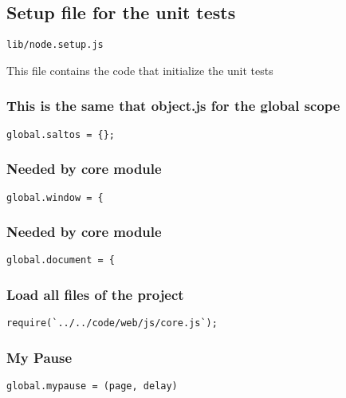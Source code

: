 \documentclass[a4paper]{article}
\begin{document}
\hypertarget{toc11}{}
\subsection{Setup file for the unit tests}

\begin{lstlisting}
lib/node.setup.js
\end{lstlisting}

This file contains the code that initialize the unit tests

\hypertarget{toc12}{}
\subsubsection{This is the same that object.js for the global scope}

\begin{lstlisting}
global.saltos = {};
\end{lstlisting}

\hypertarget{toc13}{}
\subsubsection{Needed by core module}

\begin{lstlisting}
global.window = {
\end{lstlisting}

\hypertarget{toc14}{}
\subsubsection{Needed by core module}

\begin{lstlisting}
global.document = {
\end{lstlisting}

\hypertarget{toc15}{}
\subsubsection{Load all files of the project}

\begin{lstlisting}
require(`../../code/web/js/core.js`);
\end{lstlisting}

\hypertarget{toc16}{}
\subsubsection{My Pause}

\begin{lstlisting}
global.mypause = (page, delay)
\end{lstlisting}
\end{document}
